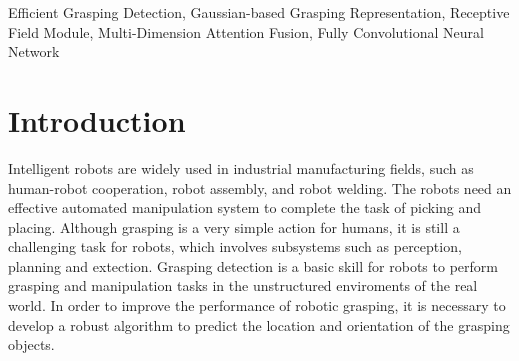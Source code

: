 \documentclass[journal]{IEEEtran}
\begin{document}
\begin{IEEEkeywords}
Efficient Grasping Detection, Gaussian-based Grasping Representation, Receptive Field Module, Multi-Dimension Attention Fusion, Fully Convolutional Neural Network
\end{IEEEkeywords}

\section{Introduction}  
Intelligent robots are widely used in industrial manufacturing fields, such as human-robot cooperation, robot assembly, and robot welding. The robots need an effective automated manipulation system to complete the task of picking and placing. Although grasping is a very simple action for humans, it is still a challenging task for robots, which involves subsystems such as perception, planning and extection. Grasping detection is a basic skill for robots to perform grasping and manipulation tasks in the unstructured enviroments of the real world. In order to improve the performance of robotic grasping, it is necessary to develop a robust algorithm to predict the location and orientation of the grasping objects. 
\end{document}
